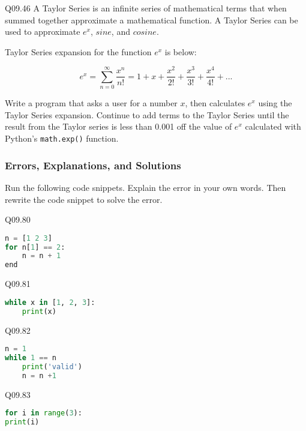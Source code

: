 \documentclass{book}
\newcommand{\passthrough}[1]{#1}
\begin{document}
Q09.46 A Taylor Series is an infinite series of mathematical terms that
when summed together approximate a mathematical function. A Taylor
Series can be used to approximate \(e^x\), \(sine\), and \(cosine\).

Taylor Series expansion for the function \(e^x\) is below:

\[  {e^x} = \sum\limits_{n = 0}^\infty  {\frac{{{x^n}}}{{n!}}}  = 1 + x + \frac{{{x^2}}}{{2!}} + \frac{{{x^3}}}{{3!}} + \frac{{{x^4}}}{{4!}} + ... \]

Write a program that asks a user for a number \(x\), then calculates
\(e^x\) using the Taylor Series expansion. Continue to add terms to the
Taylor Series until the result from the Taylor series is less than 0.001
off the value of \(e^x\) calculated with Python's
\passthrough{\lstinline!math.exp()!} function.
    




    
        \hypertarget{errors-explanations-and-solutions}{%
\subsubsection{Errors, Explanations, and
Solutions}\label{errors-explanations-and-solutions}}

Run the following code snippets. Explain the error in your own words.
Then rewrite the code snippet to solve the error.
    




    
        Q09.80

\begin{lstlisting}[language=Python]
n = [1 2 3]
for n[1] == 2:
    n = n + 1
end
\end{lstlisting}

Q09.81

\begin{lstlisting}[language=Python]
while x in [1, 2, 3]:
    print(x)
\end{lstlisting}

Q09.82

\begin{lstlisting}[language=Python]
n = 1
while 1 == n
    print('valid')
    n = n +1
\end{lstlisting}

Q09.83

\begin{lstlisting}[language=Python]
for i in range(3):
print(i)
\end{lstlisting}
\end{document}
